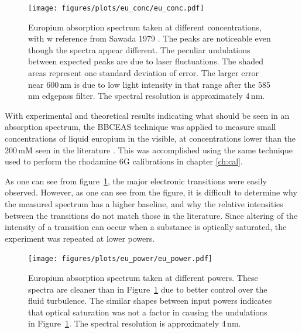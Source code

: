 \begin{figure}[t]
\begin{center}
\texttt{[image: figures/plots/eu\_conc/eu\_conc.pdf]}
\end{center}
\caption[Europium Absorption Spectra at different Concentrations]{Europium absorption spectrum taken at different concentrations, with w reference from Sawada 1979 \cite{Sawada:1979vca}. The peaks are noticeable even though the spectra appear different. The peculiar undulations between expected peaks are due to laser fluctuations. The shaded areas represent one standard deviation of error. The larger error near 600\,nm is due to low light intensity in that range after the 585\,nm edgepass filter. The spectral resolution is approximately 4\,nm.}
\label{fig:eu_conc}
\end{figure}

With experimental and theoretical results indicating what should be seen in
an absorption spectrum, the \ac{BBCEAS} technique was applied to measure
small concentrations of liquid europium in the visible, at concentrations
lower than the 200\,mM seen in the literature \cite{Sawada:1979vca}. This
was accomplished using the same technique used to perform the rhodamine 6G
calibrations in chapter \ref{ch:cal}.

As one can see from figure~\ref{fig:eu_conc}, the major electronic transitions
were easily observed. However, as one can see from the figure, it is difficult
to determine why the measured spectrum has a higher baseline, and why the
relative intensities between the transitions do not match those in the
literature. Since altering of the intensity of a transition can occur when a
substance is optically saturated, the experiment was repeated at lower powers.

\begin{figure}[t]
\begin{center}
  \texttt{[image: figures/plots/eu\_power/eu\_power.pdf]}
\end{center}
\caption[Europium Absorption Spectra at different Input Intensities]{Europium absorption spectrum taken at different powers. These spectra are cleaner than in Figure~\ref{fig:eu_conc} due to better control over the fluid turbulence. The similar shapes between input powers indicates that optical saturation was not a factor in causing the undulations in Figure~\ref{fig:eu_conc}. The spectral resolution is approximately 4\,nm.}
\label{fig:eu_power}
\end{figure}

